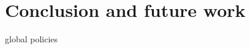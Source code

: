 \documentclass[conference]{IEEEtran}
\begin{document}

\section{Conclusion and future work}\label{sec:conclusion}

global policies




\end{document}
